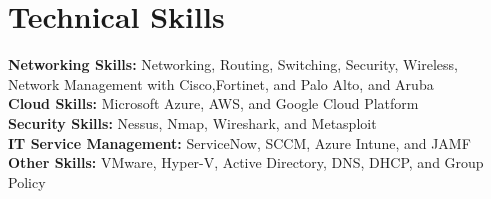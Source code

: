 
\section{Technical Skills}
 \begin{itemize}[leftmargin=0.15in, label={}]
    \small{\item{
      \textbf{\color{blue}Networking Skills: }{Networking, Routing, Switching, Security, Wireless, Network Management with Cisco,Fortinet, and Palo Alto, and Aruba} \\
      \vspace{2pt}
      \textbf{\color{blue}Cloud Skills: }{Microsoft Azure, AWS, and Google Cloud Platform} \\
      \vspace{2pt}
      \textbf{\color{blue}Security Skills: }{Nessus, Nmap, Wireshark, and Metasploit} \\
      \vspace{2pt}
      \textbf{\color{blue} IT Service Management: }{ServiceNow, SCCM, Azure Intune, and JAMF} \\
      \vspace{2pt}
      \textbf{\color{blue}Other Skills: }{VMware, Hyper-V, Active Directory, DNS, DHCP, and Group Policy} \\
    }}

 \end{itemize}
